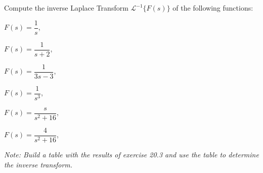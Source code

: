 {
Compute the inverse Laplace Transform ${\mathcal L}^{-1}\{F(s)\}$ of the following functions:
\begin{iii}
\begin{multicols}{2}
\item $F(s) = \dfrac{1}{s}$,
\item $F(s) = \dfrac{1}{s+2}$,
\item $F(s) = \dfrac{1}{3s-3}$,
\item $F(s) = \dfrac{1}{s^3}$,
\item $F(s) = \dfrac{s}{s^2+16}$,
\item $F(s) = \dfrac{4}{s^2+16}$,
\end{multicols}
\end{iii}

\textit{Note: Build a table with the results of exercise 20.3 and use the table to determine the inverse transform.}
}

{
}
